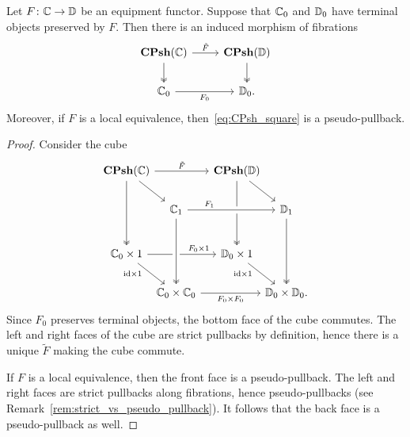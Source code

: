 \documentclass[11pt,oneside,article]{memoir}
\begin{document}
\begin{lemma}
      \label{lem:Psh_pullback}
   Let $F\colon\mathbb{C}\to\mathbb{D}$ be an equipment functor. Suppose that $\mathbb{C}_0$ and
   $\mathbb{D}_0$ have terminal objects preserved by $F$. Then there is an induced
   morphism of fibrations
   \begin{equation} \begin{tikzcd}
         \label{eq:CPsh_square}
      \CPsh(\dcat{C}) \ar[r,"\tilde{F}"] \ar[d,two heads] %
         & \CPsh(\dcat{D}) \ar[d,two heads] \\
      \dcat{C}_0 \ar[r,"F_0"']
         & \dcat{D}_0.
   \end{tikzcd} \end{equation}
   Moreover, if $F$ is a local equivalence, then~\eqref{eq:CPsh_square} is a pseudo-pullback.
\end{lemma}
\begin{proof}
   Consider the cube
   \[ \begin{tikzcd}[row sep={40,between origins}, column sep={55,between origins}]
      \CPsh(\dcat{C}) \ar[rr,"\tilde{F}"] \ar[dr] \ar[dd,two heads]
      &[-10] & \CPsh(\dcat{D}) \ar[dd,two heads] \ar[dr] &[-10] \\[-5]
      & \dcat{C}_1 \ar[rr,crossing over,"F_1" near start]
         && \dcat{D}_1 \ar[dd,two heads] \\
      \dcat{C}_0\times 1 \ar[rr,"F_0\times 1" pos=.75]
            \ar[dr,"\id\times 1"' {pos=.25,inner sep=2pt}]
         && \dcat{D}_0\times 1 \ar[dr,"\id\times 1"' {pos=.25,inner sep=2pt}] & \\[-5]
      & \dcat{C}_0\times\dcat{C}_0 \ar[rr,"F_0\times F_0"']
            \ar[from=uu,crossing over,two heads]
         && \dcat{D}_0\times\dcat{D}_0.
   \end{tikzcd} \]
   Since $F_0$ preserves terminal objects, the bottom face of the cube commutes. The left and right faces of
   the cube are strict pullbacks by definition, hence there is a unique $\tilde{F}$ making the cube commute.

   If $F$ is a local equivalence, then the front face is a pseudo-pullback. The left and right faces
   are strict pullbacks along fibrations, hence pseudo-pullbacks (see Remark~\ref{rem:strict_vs_pseudo_pullback}).  It follows that the
   back face is a pseudo-pullback as well.
\end{proof}
\end{document}
